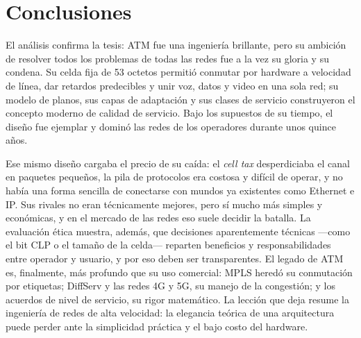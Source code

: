 \documentclass[12pt,a4paper]{article}
\begin{document}
\section{Conclusiones}

El análisis confirma la tesis: ATM fue una ingeniería brillante, pero su ambición de resolver todos los problemas de todas las redes fue a la vez su gloria y su condena. Su celda fija de 53 octetos permitió conmutar por hardware a velocidad de línea, dar retardos predecibles y unir voz, datos y video en una sola red; su modelo de planos, sus capas de adaptación y sus clases de servicio construyeron el concepto moderno de calidad de servicio. Bajo los supuestos de su tiempo, el diseño fue ejemplar y dominó las redes de los operadores durante unos quince años.

Ese mismo diseño cargaba el precio de su caída: el \emph{cell tax} desperdiciaba el canal en paquetes pequeños, la pila de protocolos era costosa y difícil de operar, y no había una forma sencilla de conectarse con mundos ya existentes como Ethernet e IP. Sus rivales no eran técnicamente mejores, pero sí mucho más simples y económicas, y en el mercado de las redes eso suele decidir la batalla. La evaluación ética muestra, además, que decisiones aparentemente técnicas ---como el bit CLP o el tamaño de la celda--- reparten beneficios y responsabilidades entre operador y usuario, y por eso deben ser transparentes. El legado de ATM es, finalmente, más profundo que su uso comercial: MPLS heredó su conmutación por etiquetas; DiffServ y las redes 4G y 5G, su manejo de la congestión; y los acuerdos de nivel de servicio, su rigor matemático. La lección que deja resume la ingeniería de redes de alta velocidad: la elegancia teórica de una arquitectura puede perder ante la simplicidad práctica y el bajo costo del hardware.
\end{document}
